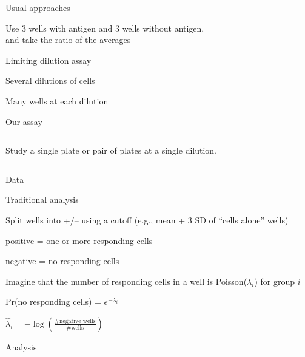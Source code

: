 \documentclass[aspectratio=169,12pt,t]{beamer}
\begin{document}
\begin{frame}{Usual approaches}

  \bbi

\item Use 3 wells with antigen and 3 wells without antigen,\\
  and take the ratio of the averages

  \item Limiting dilution assay
    \bi
  \item Several dilutions of cells
  \item Many wells at each dilution
    \ei
    \ei

\end{frame}


\begin{frame}[c]{Our assay}

  \begin{columns}[c]
    Study a single plate or pair of plates at a single dilution.



  \end{columns}


\end{frame}

\begin{frame}[c]{Data}
\end{frame}


\begin{frame}[c]{Traditional analysis}
  \bbi
  \item Split wells into +/-- using a cutoff (e.g., mean + 3 SD of
    ``cells alone'' wells)
    \bi
  \item[positive =] one or more responding cells
  \item[negative =] no responding cells
    \ei

  \item Imagine that the number of responding cells in a well is
    Poisson($\lambda_i$) for group $i$

    \vspace{4mm}

  \qquad Pr(no responding cells) = $e^{-\lambda_i}$

    \vspace{4mm}

  \qquad $\hat{\lambda}_i = -\log\left(\frac{\text{\# negative wells}}{\text{\# wells}}\right)$

    \ei

\end{frame}

\begin{frame}[c]{Analysis}
\end{frame}
\end{document}
